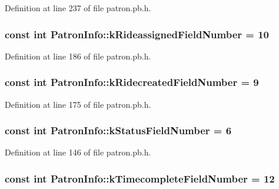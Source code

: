 Definition at line 237 of file patron.\-pb.\-h.

\hypertarget{classPatronInfo_aff3777be2a5d0934195ba5ed8787e3c2}{
\subsubsection[{k\-Rideassigned\-Field\-Number}]{\setlength{\rightskip}{0pt plus 5cm}const int Patron\-Info\-::k\-Rideassigned\-Field\-Number = 10\hspace{0.3cm}{\ttfamily [static]}}}\label{classPatronInfo_aff3777be2a5d0934195ba5ed8787e3c2}


Definition at line 186 of file patron.\-pb.\-h.

\hypertarget{classPatronInfo_a645a316e084faa455b79f1c5d128eda9}{
\subsubsection[{k\-Ridecreated\-Field\-Number}]{\setlength{\rightskip}{0pt plus 5cm}const int Patron\-Info\-::k\-Ridecreated\-Field\-Number = 9\hspace{0.3cm}{\ttfamily [static]}}}\label{classPatronInfo_a645a316e084faa455b79f1c5d128eda9}


Definition at line 175 of file patron.\-pb.\-h.

\hypertarget{classPatronInfo_aafe92efae284bea41a79af07b83773d4}{
\subsubsection[{k\-Status\-Field\-Number}]{\setlength{\rightskip}{0pt plus 5cm}const int Patron\-Info\-::k\-Status\-Field\-Number = 6\hspace{0.3cm}{\ttfamily [static]}}}\label{classPatronInfo_aafe92efae284bea41a79af07b83773d4}


Definition at line 146 of file patron.\-pb.\-h.

\hypertarget{classPatronInfo_ab494da2e488d26bdb450fd6a2e1956aa}{
\subsubsection[{k\-Timecomplete\-Field\-Number}]{\setlength{\rightskip}{0pt plus 5cm}const int Patron\-Info\-::k\-Timecomplete\-Field\-Number = 12\hspace{0.3cm}{\ttfamily [static]}}}\label{classPatronInfo_ab494da2e488d26bdb450fd6a2e1956aa}


